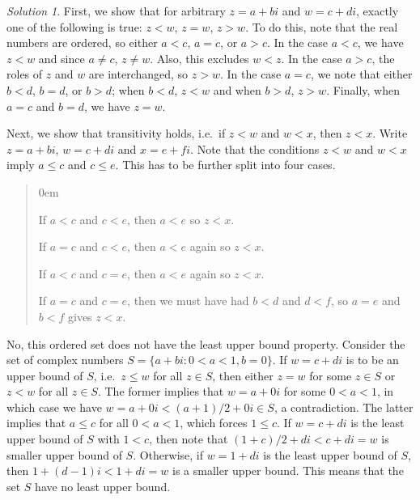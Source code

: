 \documentclass[11pt]{report}
\theoremstyle{remark}
\newtheorem*{solution}{Solution}
\begin{document}
    \begin{solution}
        First, we show that for arbitrary $z = a + bi$ and $w = c + di$, exactly one
        of the following is true: $z < w$, $z = w$, $z > w$. To do this, note that
        the real numbers are ordered, so either $a < c$, $a = c$, or $a > c$.
        In the case $a < c$, we have $z < w$ and since $a \neq c$, $z \neq w$. Also,
        this excludes $w < z$. In the case $a > c$, the roles of $z$ and $w$ are
        interchanged, so $z > w$. In the case $a = c$, we note that either $b < d$,
        $b = d$, or $b > d$; when $b < d$, $z < w$ and when $b > d$, $z > w$.
        Finally, when $a = c$ and $b = d$, we have $z = w$.

        Next, we show that transitivity holds, i.e.\ if $z < w$ and $w < x$, then $z
        < x$. Write $z = a + bi$, $w = c + di$ and $x = e + fi$. Note that the
        conditions $z < w$ and $w < x$ imply $a \leq c$ and $c \leq e$. This has to
        be further split into four cases.
        \begin{quote}
        \begin{description}
            \itemsep0em
            \item[Case 1] If $a < c$ and $c < e$, then $a < e$ so $z < x$.
            \item[Case 2] If $a = c$ and $c < e$, then $a < e$ again so $z < x$.
            \item[Case 3] If $a < c$ and $c = e$, then $a < e$ again so $z < x$.
            \item[Case 4] If $a = c$ and $c = e$, then we must have had $b < d$
            and $d < f$, so $a = e$ and $b < f$ gives $z < x$.
        \end{description}
        \end{quote}

        No, this ordered set does not have the least upper bound property. Consider
        the set of complex numbers $S = \{a + bi: 0 < a < 1, b = 0\}$. If $w = c +
        di$ is to be an upper bound of $S$, i.e.\ $z \leq w$ for all $z \in S$, then 
        either $z = w$ for some $z \in S$ or $z < w$ for all $z \in S$.
        The former implies that $w = a + 0i$ for some $0 < a < 1$, in which case we
        have $w = a + 0i < (a + 1) / 2 + 0i \in S$, a contradiction. The latter
        implies that $a \leq c$ for all $0 < a < 1$, which forces $1 \leq c$.
        If $w = c + di$ is the least upper bound of $S$ with $1 < c$, then note that
        $(1 + c) / 2 + di < c + di = w$ is smaller upper bound of $S$. Otherwise, if
        $w = 1 + di$ is the least upper bound of $S$, then $1 + (d - 1)i < 1 + di =
        w$ is a smaller upper bound. This means that the set $S$ have no least upper
        bound.
    \end{solution}
    
\end{document}
